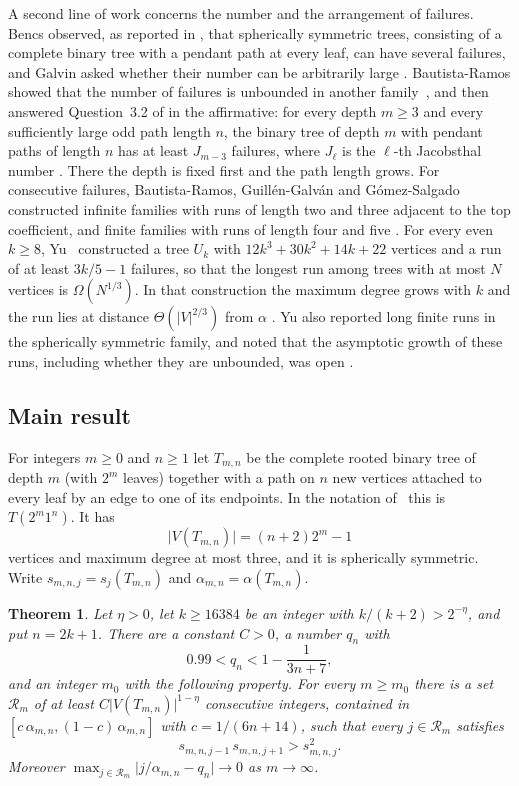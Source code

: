 \documentclass{amsart}
\newtheorem{theorem}{Theorem}[section]
\theoremstyle{definition}
\theoremstyle{remark}
\numberwithin{equation}{section}
\newcommand{\abs}[1]{\lvert #1\rvert}
\begin{document}
A second line of work concerns the number and the arrangement of failures. Bencs observed, as reported in \cite[Section~3]{Gal26}, that spherically symmetric trees, consisting of a complete binary tree with a pendant path at every leaf, can have several failures, and Galvin asked whether their number can be arbitrarily large \cite[Question~3.2]{Gal26}. Bautista-Ramos showed that the number of failures is unbounded in another family~\cite{BR25}, and then answered Question~3.2 of \cite{Gal26} in the affirmative: for every depth $m\ge3$ and every sufficiently large odd path length $n$, the binary tree of depth $m$ with pendant paths of length $n$ has at least $J_{m-3}$ failures, where $J_\ell$ is the $\ell$-th Jacobsthal number \cite[Theorem~3 and Corollary~3]{BR26}. There the depth is fixed first and the path length grows. For consecutive failures, Bautista-Ramos, Guill\'en-Galv\'an and G\'omez-Salgado constructed infinite families with runs of length two and three adjacent to the top coefficient, and finite families with runs of length four and five \cite[Corollaries~5 and~6 and Section~4.4]{BGG26}. For every even $k\ge8$, Yu~\cite[Theorem~1.2]{Yu26} constructed a tree $U_k$ with $12k^3+30k^2+14k+22$ vertices and a run of at least $3k/5-1$ failures, so that the longest run among trees with at most $N$ vertices is $\Omega(N^{1/3})$. In that construction the maximum degree grows with $k$ and the run lies at distance $\Theta(\abs{V}^{2/3})$ from $\alpha$ \cite[Section~8]{Yu26}. Yu also reported long finite runs in the spherically symmetric family, and noted that the asymptotic growth of these runs, including whether they are unbounded, was open \cite[Section~1]{Yu26}.

\subsection{Main result}

For integers $m\ge0$ and $n\ge1$ let $T_{m,n}$ be the complete rooted binary tree of depth $m$ (with $2^m$ leaves) together with a path on $n$ new vertices attached to every leaf by an edge to one of its endpoints. In the notation of~\cite{Gal26,BR26} this is $T(2^m1^n)$. It has
\[
\abs{V(T_{m,n})}=(n+2)2^m-1
\]
vertices and maximum degree at most three, and it is spherically symmetric. Write $s_{m,n,j}=s_j(T_{m,n})$ and $\alpha_{m,n}=\alpha(T_{m,n})$.

\begin{theorem}\label{thm:main}
Let $\eta>0$, let $k\ge 16384$ be an integer with $k/(k+2)>2^{-\eta}$, and put $n=2k+1$. There are a constant $C>0$, a number $q_n$ with
\[
0.99<q_n<1-\frac{1}{3n+7},
\]
and an integer $m_0$ with the following property. For every $m\ge m_0$ there is a set $\mathcal R_m$ of at least $C\abs{V(T_{m,n})}^{1-\eta}$ consecutive integers, contained in $[c\,\alpha_{m,n},(1-c)\,\alpha_{m,n}]$ with $c=1/(6n+14)$, such that every $j\in\mathcal R_m$ satisfies
\[
s_{m,n,j-1}\,s_{m,n,j+1}>s_{m,n,j}^2 .
\]
Moreover $\max_{j\in\mathcal R_m}\abs{j/\alpha_{m,n}-q_n}\to0$ as $m\to\infty$.
\end{theorem}
\end{document}
